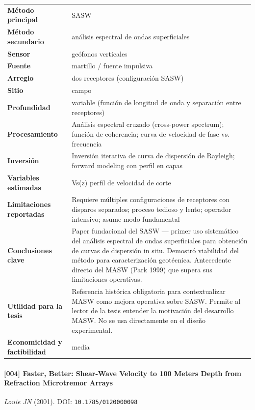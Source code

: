 \begin{center}\scriptsize
\begin{tabularx}{\textwidth}{@{}>{\bfseries}p{3.3cm} X@{}}
\toprule
M\'etodo principal & SASW \\
M\'etodo secundario & análisis espectral de ondas superficiales \\
Sensor & geófonos verticales \\
Fuente & martillo / fuente impulsiva \\
Arreglo & dos receptores (configuración SASW) \\
Sitio & campo \\
Profundidad & variable (función de longitud de onda y separación entre receptores) \\
Procesamiento & Análisis espectral cruzado (cross-power spectrum); función de coherencia; curva de velocidad de fase vs. frecuencia \\
Inversi\'on & Inversión iterativa de curva de dispersión de Rayleigh; forward modeling con perfil en capas \\
Variables estimadas & Vs(z) perfil de velocidad de corte \\
Limitaciones reportadas & Requiere múltiples configuraciones de receptores con disparos separados; proceso tedioso y lento; operador intensivo; asume modo fundamental \\
Conclusiones clave & Paper fundacional del SASW --- primer uso sistemático del análisis espectral de ondas superficiales para obtención de curvas de dispersión in situ. Demostró viabilidad del método para caracterización geotécnica. Antecedente directo del MASW (Park 1999) que supera sus limitaciones operativas. \\
Utilidad para la tesis & Referencia histórica obligatoria para contextualizar MASW como mejora operativa sobre SASW. Permite al lector de la tesis entender la motivación del desarrollo MASW. No se usa directamente en el diseño experimental. \\
Economicidad y factibilidad & media \\
\bottomrule
\end{tabularx}
\end{center}

\paragraph{[004] Faster, Better: Shear-Wave Velocity to 100 Meters Depth from Refraction Microtremor Arrays} \emph{Louie JN} (2001).
{\scriptsize DOI: \texttt{10.1785/0120000098}}

